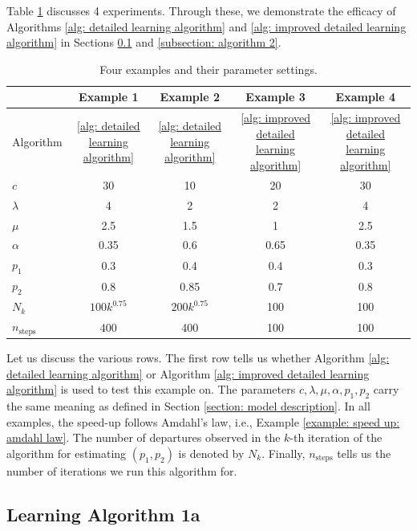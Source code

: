 \documentclass[11pt]{article}
\theoremstyle{remark}
\theoremstyle{definition}
\numberwithin{equation}{section}
\begin{document}
Table \ref{table: examples} discusses 4 experiments.
Through these, we demonstrate the efficacy of Algorithms \ref{alg: detailed learning algorithm} and \ref{alg: improved detailed learning algorithm} in Sections \ref{subsection: algorithm 1} and \ref{subsection: algorithm 2}.

\begin{table}[h!]
    \centering
    \begin{tabular}{lcccc}
        \toprule
         & Example 1 & Example 2 & Example 3 & Example 4 \\
        \midrule
        Algorithm & \ref{alg: detailed learning algorithm} & \ref{alg: detailed learning algorithm} & \ref{alg: improved detailed learning algorithm} & \ref{alg: improved detailed learning algorithm} \\
        $c$ & 30 & 10 & 20 & 30 \\
        $\lambda$ & 4 & 2 & 2 & 4 \\
        $\mu$ & 2.5 & 1.5 & 1 & 2.5 \\
        $\alpha$ & 0.35 & 0.6 & 0.65 & 0.35 \\
        $p_1$ & 0.3 & 0.4 & 0.4 & 0.3 \\
        $p_2$ & 0.8 & 0.85 & 0.7 & 0.8 \\
        $N_k$ & $100 k^{0.75}$ & $200 k^{0.75}$ & 100 & 100 \\
        $n_{\text{steps}}$ & 400 & 400 & 100 & 100 \\
        \bottomrule
    \end{tabular}
    \caption{Four examples and their parameter settings.}
    \label{table: examples}
\end{table}

Let us discuss the various rows.
The first row tells us whether Algorithm \ref{alg: detailed learning algorithm} or Algorithm \ref{alg: improved detailed learning algorithm} is used to test this example on.
The {parameters} $c, \lambda, \mu, \alpha, p_1, p_2$ carry the same meaning as defined in Section \ref{section: model description}.
In all examples, the speed-up follows Amdahl's law, i.e., Example \ref{example: speed up: amdahl law}.
The number of departures observed in the $k$-th {iteration} of the algorithm for estimating $(p_1, p_2)$ is denoted by $N_k$.
Finally, $n_{\text{steps}}$ tells us the number of iterations we  run this algorithm for.




\subsection{Learning Algorithm 1a} \label{subsection: algorithm 1}
\end{document}
